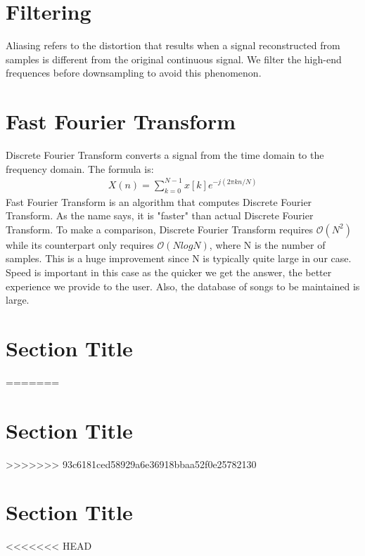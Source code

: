 \documentclass[12pt, a4paper]{IEEEtran}
\begin{document}
\section{Filtering}
Aliasing refers to the distortion that results when a signal reconstructed from samples is different from the original continuous signal.
We filter the high-end frequences before downsampling to avoid this phenomenon.

\section{Fast Fourier Transform}
Discrete Fourier Transform converts a signal from the time domain to the frequency domain. The formula is:
\begin{align*}
    X(n) = \sum_{k=0}^{N-1} x[k] e^{-j(2\pi kn/N)}
\end{align*}
Fast Fourier Transform is an algorithm that computes Discrete Fourier Transform. As the name says, it is "faster" than actual Discrete Fourier Transform. To make a comparison, Discrete Fourier Transform requires \(\mathcal{O}(N^2)\) while its counterpart only requires \(\mathcal{O}(NlogN)\), where N is the number of samples. This is a huge improvement since N is typically quite large in our case.\\
Speed is important in this case as the quicker we get the answer, the better experience we provide to the user.
Also, the database of songs to be maintained is large.

\vspace*{-2cm}
\section{Section Title}
\vspace*{-1cm}
=======
\section{Section Title}
>>>>>>> 93c6181ced58929a6e36918bbaa52f0e25782130
\blindtext

\section{Section Title}
\blindtext

<<<<<<< HEAD
\pagebreak

    
\end{document}

